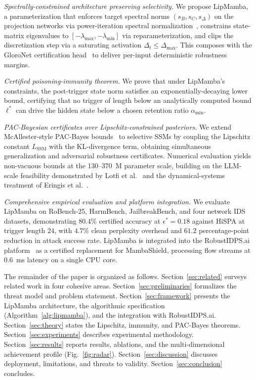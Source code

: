 \documentclass[12pt,a4paper]{article}
\theoremstyle{definition}
\theoremstyle{remark}
\newcommand{\modelname}{LipMamba}
\begin{document}
\textit{Spectrally-constrained architecture preserving selectivity.} We propose \modelname{}, a parameterization that enforces target spectral norms $(s_B, s_C, s_\Delta)$ on the projection networks via power-iteration spectral normalization~\cite{miyato2018spectral}, constrains state-matrix eigenvalues to $[-\lambda_{\max}, -\lambda_{\min}]$ via reparameterization, and clips the discretization step via a saturating activation $\Delta_t \leq \Delta_{\max}$. This composes with the GloroNet certification head~\cite{leino2021globally} to deliver per-input deterministic robustness margins.

\textit{Certified poisoning-immunity theorem.} We prove that under \modelname{}'s constraints, the post-trigger state norm satisfies an exponentially-decaying lower bound, certifying that no trigger of length below an analytically computed bound $\ell^*$ can drive the hidden state below a chosen retention ratio $\alpha_{\min}$.

\textit{PAC-Bayesian certificates over Lipschitz-constrained posteriors.} We extend McAllester-style PAC-Bayes bounds~\cite{mcallester2003pac,perezortiz2021tighter} to selective SSMs by coupling the Lipschitz constant $L_{\mathrm{SSM}}$ with the KL-divergence term, obtaining simultaneous generalization and adversarial robustness certificates. Numerical evaluation yields non-vacuous bounds at the 130--370~M parameter scale, building on the LLM-scale feasibility demonstrated by Lotfi et al.~\cite{lotfi2024nonvacuous} and the dynamical-systems treatment of Eringis et al.~\cite{eringis2024pacbayes}.

\textit{Comprehensive empirical evaluation and platform integration.} We evaluate \modelname{} on RoBench-25, HarmBench, JailbreakBench, and four network IDS datasets, demonstrating $80.4\%$ certified accuracy at $\epsilon^* = 0.18$ against HiSPA at trigger length $24$, with $4.7\%$ clean perplexity overhead and $61.2$ percentage-point reduction in attack success rate. \modelname{} is integrated into the RobustIDPS.ai platform~\cite{anaedevha2026robustidps} as a certified replacement for MambaShield, processing flow streams at $0.6$~ms latency on a single CPU core.

The remainder of the paper is organized as follows. Section~\ref{sec:related} surveys related work in four cohesive areas. Section~\ref{sec:preliminaries} formalizes the threat model and problem statement. Section~\ref{sec:framework} presents the \modelname{} architecture, the algorithmic specification (Algorithm~\ref{alg:lipmamba}), and the integration with RobustIDPS.ai. Section~\ref{sec:theory} states the Lipschitz, immunity, and PAC-Bayes theorems. Section~\ref{sec:experiments} describes experimental methodology. Section~\ref{sec:results} reports results, ablations, and the multi-dimensional achievement profile (Fig.~\ref{fig:radar}). Section~\ref{sec:discussion} discusses deployment, limitations, and threats to validity. Section~\ref{sec:conclusion} concludes.
\end{document}
